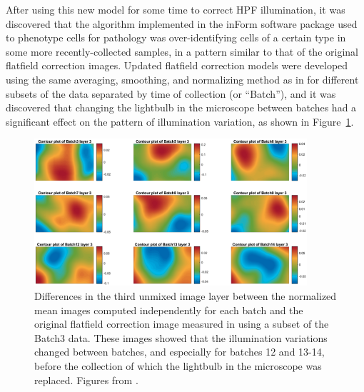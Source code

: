 \documentclass[letterpaper,11pt]{article}
\newcommand{\reffig}[1]{Figure~\ref{#1}}
\begin{document}
After using this new model for some time to correct HPF illumination, it was discovered \cite{Ben_flatfielding_1} that the algorithm implemented in the inForm software package \cite{Kramer2018} used to phenotype cells for pathology was over-identifying cells of a certain type in some more recently-collected samples, in a pattern similar to that of the original flatfield correction images. Updated flatfield correction models were developed using the same averaging, smoothing, and normalizing method as in \cite{Alex_flatfielding_2} for different subsets of the data separated by time of collection (or ``Batch''), and it was discovered that changing the lightbulb in the microscope between batches had a significant effect on the pattern of illumination variation, as shown in \reffig{fig:third_flatfielding}. 

\begin{figure}[!ht]
\centering
\includegraphics[width=0.9\textwidth]{images/introduction/third_flatfield_differences}
\caption{\footnotesize Differences in the third unmixed image layer between the normalized mean images computed independently for each batch and the original flatfield correction image measured in \cite{Alex_flatfielding_2} using a subset of the Batch3 data. These images showed that the illumination variations changed between batches, and especially for batches 12 and 13-14, before the collection of which the lightbulb in the microscope was replaced. Figures from \cite{Ben_flatfielding_1}.}
\label{fig:third_flatfielding}
\end{figure}
\end{document}
